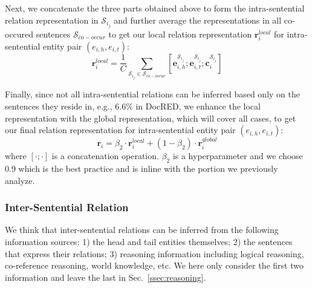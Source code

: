 \documentclass[11pt,a4paper]{article}
\begin{document}
Next, we concatenate the three parts obtained above to form the intra-sentential relation representation in $\mathcal{S}_{i_j}$ and further average the representations in all co-occured sentences $\mathcal{S}_{co-occur}$ to get our local relation representation $\textbf{r}^{local}_{i}$ for intra-sentential entity pair $(e_{i,h}, e_{i,t})$:
\begin{equation}
    \textbf{r}^{local}_{i} = \frac{1}{C} \sum_{\mathcal{S}_{i_j} \in {\mathcal{S}_{co-occur}}} [\textbf{e}^{\mathcal{S}_{i_j}}_{i,h}; \textbf{e}^{\mathcal{S}_{i_j}}_{i,t}; \textbf{c}^{\mathcal{S}_{i_j}}_{i}]
\end{equation}

Finally, since not all intra-sentential relations can be inferred based only on the sentences they reside in, e.g., 6.6$\%$ in DocRED, we enhance the local representation with the global representation, which will cover all cases, to get our final relation representation for intra-sentential entity pair $(e_{i,h}, e_{i,t})$:
\begin{equation}
    \textbf{r}_{i} = \beta_{2} \cdot \textbf{r}^{local}_{i} + (1 - \beta_{2}) \cdot \textbf{r}^{global}_{i}
\end{equation}
where $[\cdot;\cdot]$ is a concatenation operation. $\beta_{2}$ is a hyperparameter and we choose 0.9 which is the best practice and is inline with the portion we previously analyze.

\subsubsection{Inter-Sentential Relation}
We think that inter-sentential relations can be inferred from the following information sources: 1) the head and tail entities themselves; 2) the sentences that express their relations; 3) reasoning information including logical reasoning, co-reference reasoning, world knowledge, etc. We here only consider the first two information and leave the last in Sec.~\ref{ssec:reasoning}.
\end{document}
